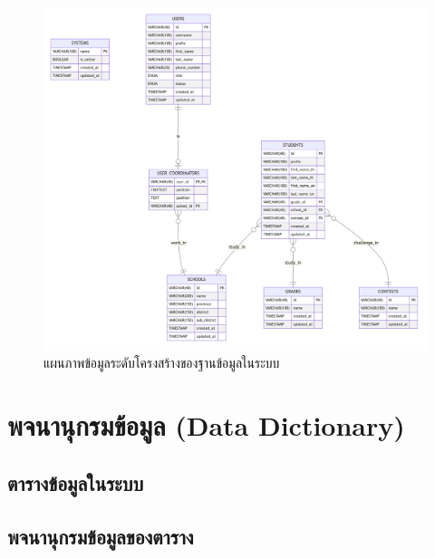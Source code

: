 \begin{figure}[H]
    \centering
    \includegraphics[width=120mm,scale=1.0]{diagrams/database.png}
    \caption{แผนภาพข้อมูลระดับโครงสร้างของฐานข้อมูลในระบบ}
    \label{fig:physical-database-diagram}
\end{figure}

\newpage

\section{พจนานุกรมข้อมูล (Data Dictionary)}

\subsection{ตารางข้อมูลในระบบ}


\subsection{พจนานุกรมข้อมูลของตาราง}







